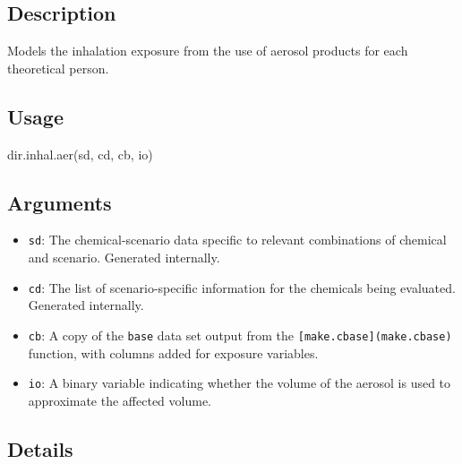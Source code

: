 \documentclass[
]{article}
\newenvironment{Shaded}{\begin{snugshade}}{\end{snugshade}}
\newcommand{\FunctionTok}[1]{\textcolor[rgb]{0.00,0.00,0.00}{#1}}
\newcommand{\NormalTok}[1]{#1}
\providecommand{\tightlist}{%
  \setlength{\itemsep}{0pt}\setlength{\parskip}{0pt}}
\begin{document}
\hypertarget{description-15}{%
\subsection{Description}\label{description-15}}

Models the inhalation exposure from the use of aerosol products for each
theoretical person.

\hypertarget{usage-15}{%
\subsection{Usage}\label{usage-15}}

\begin{Shaded}
\begin{Highlighting}[]
\FunctionTok{dir.inhal.aer}\NormalTok{(sd, cd, cb, io)}
\end{Highlighting}
\end{Shaded}

\hypertarget{arguments-12}{%
\subsection{Arguments}\label{arguments-12}}

\begin{itemize}
\tightlist
\item
  \texttt{sd}: The chemical-scenario data specific to relevant
  combinations of chemical and scenario. Generated internally.
\item
  \texttt{cd}: The list of scenario-specific information for the
  chemicals being evaluated. Generated internally.
\item
  \texttt{cb}: A copy of the \texttt{base} data set output from the
  \texttt{{[}make.cbase{]}(make.cbase)} function, with columns added for
  exposure variables.
\item
  \texttt{io}: A binary variable indicating whether the volume of the
  aerosol is used to approximate the affected volume.
\end{itemize}

\hypertarget{details-10}{%
\subsection{Details}\label{details-10}}
\end{document}
